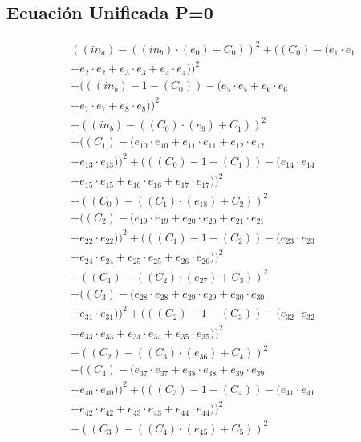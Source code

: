 \documentclass[10pt, a4paper]{article}
\begin{document}
\subsection*{Ecuación Unificada P=0}
\begin{align*}
& ((in_a) - ((in_b)  \cdot  (e_{0}) + C_{0}))^{2} + ((C_{0}) - (e_{1} \cdot e_{1} \\
& + e_{2} \cdot e_{2} + e_{3} \cdot e_{3} + e_{4} \cdot e_{4}))^{2} \\
& + (((in_b) - 1 - (C_{0})) - (e_{5} \cdot e_{5} + e_{6} \cdot e_{6} \\
& + e_{7} \cdot e_{7} + e_{8} \cdot e_{8}))^{2} \\
& + ((in_b) - ((C_{0})  \cdot  (e_{9}) + C_{1}))^{2} \\
& + ((C_{1}) - (e_{10} \cdot e_{10} + e_{11} \cdot e_{11} + e_{12} \cdot e_{12} \\
& + e_{13} \cdot e_{13}))^{2} + (((C_{0}) - 1 - (C_{1})) - (e_{14} \cdot e_{14} \\
& + e_{15} \cdot e_{15} + e_{16} \cdot e_{16} + e_{17} \cdot e_{17}))^{2} \\
& + ((C_{0}) - ((C_{1})  \cdot  (e_{18}) + C_{2}))^{2} \\
& + ((C_{2}) - (e_{19} \cdot e_{19} + e_{20} \cdot e_{20} + e_{21} \cdot e_{21} \\
& + e_{22} \cdot e_{22}))^{2} + (((C_{1}) - 1 - (C_{2})) - (e_{23} \cdot e_{23} \\
& + e_{24} \cdot e_{24} + e_{25} \cdot e_{25} + e_{26} \cdot e_{26}))^{2} \\
& + ((C_{1}) - ((C_{2})  \cdot  (e_{27}) + C_{3}))^{2} \\
& + ((C_{3}) - (e_{28} \cdot e_{28} + e_{29} \cdot e_{29} + e_{30} \cdot e_{30} \\
& + e_{31} \cdot e_{31}))^{2} + (((C_{2}) - 1 - (C_{3})) - (e_{32} \cdot e_{32} \\
& + e_{33} \cdot e_{33} + e_{34} \cdot e_{34} + e_{35} \cdot e_{35}))^{2} \\
& + ((C_{2}) - ((C_{3})  \cdot  (e_{36}) + C_{4}))^{2} \\
& + ((C_{4}) - (e_{37} \cdot e_{37} + e_{38} \cdot e_{38} + e_{39} \cdot e_{39} \\
& + e_{40} \cdot e_{40}))^{2} + (((C_{3}) - 1 - (C_{4})) - (e_{41} \cdot e_{41} \\
& + e_{42} \cdot e_{42} + e_{43} \cdot e_{43} + e_{44} \cdot e_{44}))^{2} \\
& + ((C_{3}) - ((C_{4})  \cdot  (e_{45}) + C_{5}))^{2} \\

\end{align*}
\end{document}
